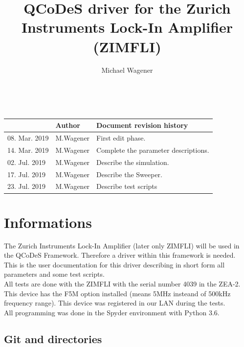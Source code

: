 \documentclass[11pt]{article} %
\title{QCoDeS driver for the Zurich Instruments Lock-In Amplifier (ZIMFLI)}
\author{Michael Wagener}
\begin{document}
\maketitle

\tableofcontents %

\ \\

\begin{longtable}{|p{2.7cm}|p{2.6cm}|p{10.3cm}|}
\hline\rowcolor{rowcolor}{\bf Date} & {\bf Author} & {\bf Document revision history} \\
\endfirsthead
\hline
08. Mar. 2019 & M.Wagener & First edit phase. \\ \hline
14. Mar. 2019 & M.Wagener & Complete the parameter descriptions. \\ \hline
02. Jul. 2019 & M.Wagener & Describe the simulation. \\ \hline
17. Jul. 2019 & M.Wagener & Describe the Sweeper. \\ \hline
23. Jul. 2019 & M.Wagener & Describe test scripts \\ \hline
\end{longtable}


\clearpage

\section{Informations}

The Zurich Instruments Lock-In Amplifier (later only ZIMFLI) will be used in the QCoDeS Framework. Therefore a driver within this framework is needed. This is the user documentation for this driver describing in short form all parameters and some test scripts. \\[0.5em]
%
All tests are done with the ZIMFLI with the serial number 4039 in the ZEA-2. This device has the F5M option installed (means 5MHz insteand of 500kHz frequency range). This device was registered in our LAN during the tests. \\[0.5em]
%
All programming was done in the Spyder environment with Python 3.6.

\subsection{Git and directories}
\end{document}

